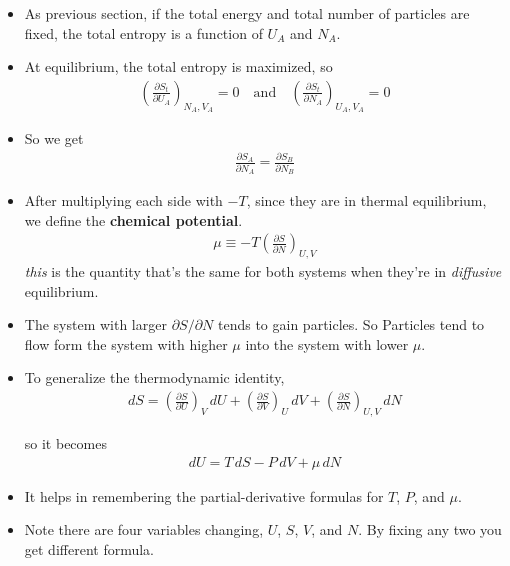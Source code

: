 \documentclass{book}
\begin{document}
\begin{itemize}
	\item As previous section, if the total energy and total number of particles are fixed, the total entropy is a
	      function of $ U_{A} $ and $ N_{A} $.
	\item At equilibrium, the total entropy is maximized, so
	      \begin{align}
		      \left( \frac{\partial S_{t}}{\partial U_{A}} \right)_{N_A, V_A} = 0
		      \quad \text{and} \quad
		      \left( \frac{\partial S_{t}}{\partial N_{A}} \right)_{U_A, V_A} = 0
	      \end{align}
	\item So we get
	      \begin{align}
		      \frac{\partial S_{A}}{\partial N_{A}} = \frac{\partial S_{B}}{\partial N_{B}}
	      \end{align}
	\item After multiplying each side with $-T$, since they are in thermal equilibrium, we define the
	      \textbf{chemical potential}.
	      \begin{align}
		      \label{eq:chemical potential}
		      \mu \equiv -T \left( \frac{\partial S}{\partial N} \right)_{U,V}
	      \end{align}
	      \textit{this} is the quantity that's the same for both systems when they're in \textit{diffusive} equilibrium.
	\item The system with larger $ \partial S/ \partial N$ tends to gain particles. So Particles tend to flow
	      form the system with higher $ \mu $ into the system with lower $ \mu $.
	\item To generalize the thermodynamic identity,
	      \begin{align}
		      dS = \left( \frac{\partial S}{\partial U} \right)_{V} \, dU
		      + \left( \frac{\partial S}{\partial V} \right)_{U}\, dV
		      + \left( \frac{\partial S}{\partial N} \right)_{U, V} \, dN
	      \end{align}

				so it becomes
				\begin{align}
					\label{eq:thermo identity with N}
					dU = T\, dS - P\, dV + \mu \, dN
				\end{align}
	\item It helps in remembering the partial-derivative formulas for $ T $, $ P $, and $ \mu $.
	\item Note there are four variables changing, $ U $, $ S $, $ V $, and $ N $. By fixing any two you get different
				formula.
\end{itemize}
\end{document}
